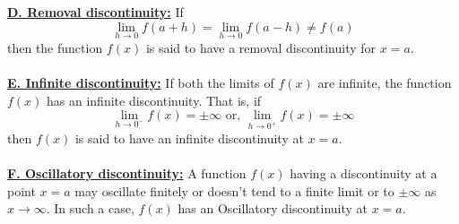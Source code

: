 \underline{\textbf{D. Removal discontinuity:}}
If \[
    \lim_{h \to 0} f(a+h) = \lim_{h \to 0} f(a-h) \neq f(a)
\] then the function $f(x)$ is said to have a removal discontinuity for $x=a$. \\~\\

\underline{\textbf{E. Infinite discontinuity:}}
If both the limits of $f(x)$ are infinite, the function $f(x)$ has an infinite discontinuity. That is, if \[
    \lim_{h \to 0^-} f(x) = \pm \infty \text{ or, } \lim_{h \to 0^+} f(x) = \pm \infty
\] then $f(x)$ is said to have an infinite discontinuity at $x=a$. \\~\\

\underline{\textbf{F. Oscillatory discontinuity:}}
A function $f(x)$ having a discontinuity at a point $x=a$ may oscillate finitely or doesn't tend to a finite limit or to $\pm \infty$ as $x \to \infty$. In such a case, $f(x)$ has an Oscillatory discontinuity at $x=a$.
